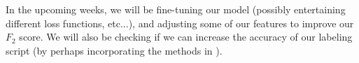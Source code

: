 \documentclass[10pt]{article}
\begin{document}
In the upcoming weeks, we will be fine-tuning our model (possibly entertaining different loss functions, etc...), and adjusting some of our features to improve our $F_2$ score. We will also be checking if we can increase the accuracy of our labeling script (by perhaps incorporating the methods in \cite{cruzalbrecht:2017,knight:2014}).

 

\end{document}
